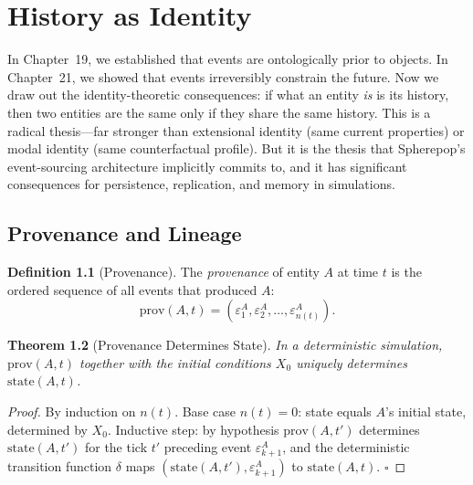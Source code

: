 \documentclass[11pt,a4paper,openany]{book}
\theoremstyle{plain}
\newtheorem{theorem}{Theorem}[chapter]
\theoremstyle{definition}
\newtheorem{definition}[theorem]{Definition}
\theoremstyle{remark}
\newenvironment{background}{%
  \begin{mdframed}[
    linecolor=sphereblue!40, backgroundcolor=sphereblue!5,
    linewidth=1pt, innertopmargin=8pt, innerbottommargin=8pt,
    innerleftmargin=10pt, innerrightmargin=10pt,
    skipabove=10pt, skipbelow=6pt
  ]%
  \setlength{\parindent}{0pt}%
  \noindent{\textcolor{sphereblue}{\textbf{Background}}}\par\smallskip\ignorespaces
}{\end{mdframed}}
\begin{document}
\chapter{History as Identity}
\label{ch:histident}

\begin{background}
  In Chapter~19, we established that events are ontologically prior to
  objects. In Chapter~21, we showed that events irreversibly constrain
  the future. Now we draw out the identity-theoretic consequences: if
  what an entity \emph{is} is its history, then two entities are the same
  only if they share the same history. This is a radical thesis---far
  stronger than extensional identity (same current properties) or modal
  identity (same counterfactual profile). But it is the thesis that
  Spherepop's event-sourcing architecture implicitly commits to, and it
  has significant consequences for persistence, replication, and memory
  in simulations.
\end{background}

\section{Provenance and Lineage}

\begin{definition}[Provenance]
  The \emph{provenance} of entity $A$ at time $t$ is the ordered sequence
  of all events that produced $A$:
  \[
    \mathrm{prov}(A, t) = (\varepsilon_1^A, \varepsilon_2^A, \ldots,
    \varepsilon_{n(t)}^A).
  \]
\end{definition}

\begin{theorem}[Provenance Determines State]
  In a deterministic simulation, $\mathrm{prov}(A,t)$ together with the
  initial conditions $X_0$ uniquely determines $\mathrm{state}(A,t)$.
\end{theorem}
\begin{proof}
  By induction on $n(t)$. Base case $n(t) = 0$: state equals $A$'s
  initial state, determined by $X_0$. Inductive step: by hypothesis
  $\mathrm{prov}(A,t')$ determines $\mathrm{state}(A,t')$ for the tick
  $t'$ preceding event $\varepsilon_{k+1}^A$, and the deterministic
  transition function $\delta$ maps
  $(\mathrm{state}(A,t'), \varepsilon_{k+1}^A)$ to $\mathrm{state}(A,t)$.
  $\square$
\end{proof}
\end{document}
